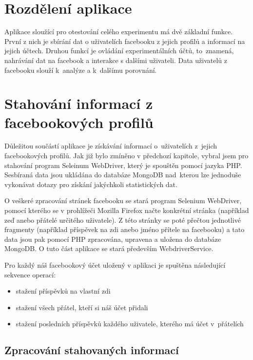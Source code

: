 \documentclass[thesis=M,czech]{FITthesis}[2013/05/10]
\begin{document}
\section{Rozdělení aplikace}

Aplikace sloužící pro otestování celého experimentu má dvě základní funkce. První z nich je sbírání dat o uživatelích facebooku z jejich profilů a informací na jejich účtech. Druhou funkcí je ovládání experimentálních účtů, to~znamená, nahrávání dat na facebook a interakce s dalšími uživateli. Data uživatelů z facebooku slouží k~analýze a k~dalšímu porovnání.

\section{Stahování informací z facebookových profilů}

Důležitou součástí aplikace je získávání informací o~uživatelích z~jejich facebookových profilů. Jak již bylo zmíněno v předchozí kapitole, vybral jsem pro stahování program Seleinum WebDriver, který je spouštěn pomocí jazyka PHP. Sesbíraná data jsou ukládána do databáze MongoDB nad~kterou lze jednoduše vykonávat dotazy pro získání jakýchkoli statistických dat.

O veškeré zpracování stránek facebooku se stará program Selenium WebDriver, pomocí kterého se v prohlížeči Mozilla Firefox načte konkrétní stránka (například zeď anebo přátelé určitého uživatele). Z této stránky se poté přečtou jednotlivé fragmenty (například příspěvek na zdi anebo jméno přítele na facebooku) a tato data jsou pak pomocí PHP zpracována, upravena a uložena do databáze MongoDB. O tuto část aplikace se stará především WebdriverService.

Pro každý náš facebookový účet uložený v aplikaci je spuštěna následující sekvence operací:

\begin{itemize}
  \item stažení příspěvků na vlastní zdi
  \item stažení všech přátel, kteří si náš účet přidali
  \item stažení posledních příspěvků každého uživatele, kterého má účet v~přátelích
\end{itemize}

\subsection{Zpracování stahovaných informací}
\end{document}
